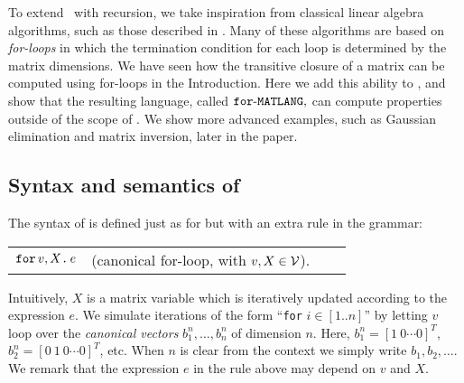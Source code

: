 
To extend \lang\ with recursion, we take inspiration from classical linear algebra algorithms, such as those described in \cite{num}. Many of these algorithms are based on \textit{for-loops} in which the termination condition for each loop is determined by the matrix dimensions. We have seen how the transitive closure of a matrix can be computed using for-loops in the Introduction. Here we add this ability to \lang, and show that the resulting language, called $\texttt{for}\text{-}\texttt{MATLANG},$ can compute properties outside of the scope of \lang. We show more advanced examples, such as Gaussian elimination and matrix inversion, later in the paper. 


\subsection{Syntax and semantics of \langfor}\label{ss:fML} The syntax of \langfor is defined just as for \lang but with an extra rule in the grammar:
\medskip

\begin{tabular}{lcll}
 $\texttt{for}\, v,X \texttt{.}\, e$ & (canonical for-loop, with $v, X \in \mathcal{V}$). 
\end{tabular}

\medskip
\noindent Intuitively, $X$ is a matrix variable which is iteratively updated according to the expression $e$. We simulate iterations of the form ``\texttt{for} $i\in [1..n]$'' by letting $v$ loop over the \textit{canonical vectors} $b_1^n,\ldots,b_n^n$ of dimension $n$. Here,
$b_1^n = [1\ 0 \cdots 0]^T$, $b_2^n = [0\ 1\ 0 \cdots 0]^T$, etc. When $n$ is clear from the context we simply write $b_1,b_2,\ldots$. We remark that the expression $e$ in the rule above may depend on $v$ and $X$. 


